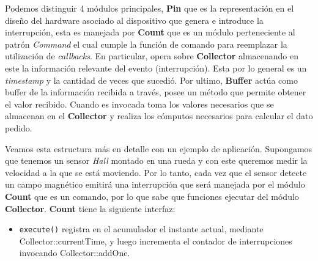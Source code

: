 \begin{figure}[h!]
\label{fig:ConnectBufferToMCU}
\end{figure}



Podemos distinguir 4 módulos principales, \textbf{Pin} que es la representación en el diseño del hardware asociado al dispositivo que genera e introduce la interrupción, esta es manejada por \textbf{Count} que es un módulo perteneciente al patrón \textit{Command} el cual cumple la función de comando para reemplazar la utilización de \textit{callbacks}. En particular, opera sobre \textbf{Collector} almacenando en este la información relevante del evento (interrupción). Esta por lo general es un \textit{timestamp} y la cantidad de veces que sucedió.  Por ultimo, \textbf{Buffer} actúa como buffer de la información recibida a través, posee un método que permite obtener el valor recibido. Cuando es invocada toma los valores necesarios que se almacenan en el \textbf{Collector} y realiza los cómputos necesarios para calcular el dato pedido.

Veamos esta estructura más en detalle con un ejemplo de aplicación. Supongamos que tenemos un sensor \textit{Hall} montado en una rueda y con este queremos medir la velocidad a la que se está moviendo. Por lo tanto, cada vez que el sensor detecte un campo magnético emitirá una interrupción que será manejada por el módulo \textbf{Count} que es un comando, por lo que sabe que funciones ejecutar del módulo \textbf{Collector}. \textbf{Count} tiene la siguiente interfaz:
\begin{itemize}
    \item \verb|execute()| registra en el acumulador el instante actual, mediante Collector::currentTime, y luego incrementa el contador de interrupciones invocando Collector::addOne.
\end{itemize}

